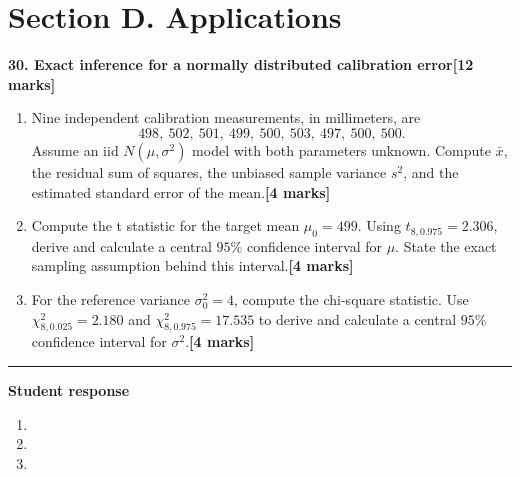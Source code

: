\documentclass[11pt,a4paper]{article}
\newlength{\BlankAnswerHeight}\setlength{\BlankAnswerHeight}{16mm}
\newcommand{\AnswerBlank}{\leavevmode\par\vspace{\BlankAnswerHeight}}
\begin{document}
\newpage\section*{Section D. Applications}
\textbf{30. Exact inference for a normally distributed calibration error}\hfill\textbf{[12 marks]}\par\medskip
\begin{enumerate}[label=(\alph*),leftmargin=8mm,itemsep=3pt]
\item Nine independent calibration measurements, in millimeters, are \[498,\ 502,\ 501,\ 499,\ 500,\ 503,\ 497,\ 500,\ 500.\] Assume an iid \(N(\mu,\sigma^2)\) model with both parameters unknown. Compute \(\bar x\), the residual sum of squares, the unbiased sample variance \(s^2\), and the estimated standard error of the mean.\hfill\textbf{[4 marks]}
\item Compute the t statistic for the target mean \(\mu_0=499\). Using \(t_{8,0.975}=2.306\), derive and calculate a central \(95\%\) confidence interval for \(\mu\). State the exact sampling assumption behind this interval.\hfill\textbf{[4 marks]}
\item For the reference variance \(\sigma_0^2=4\), compute the chi-square statistic. Use \(\chi^2_{8,0.025}=2.180\) and \(\chi^2_{8,0.975}=17.535\) to derive and calculate a central \(95\%\) confidence interval for \(\sigma^2\).\hfill\textbf{[4 marks]}
\end{enumerate}\par\medskip\hrule\medskip\textbf{Student response}\par
\begin{enumerate}[label=(\alph*),leftmargin=8mm,itemsep=3pt]
\item
\AnswerBlank
\item
\AnswerBlank
\item
\AnswerBlank
\end{enumerate}
\end{document}
